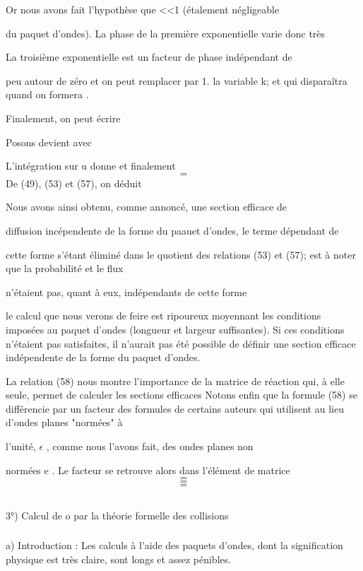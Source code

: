 Or nous avons fait l'hypothèse que <<1 (étalement négligeable

du paquet d'ondes). La phase de la première exponentielle varie donc très

La troisième exponentielle est un facteur de phase indépendant de

peu autour de zéro et on peut remplacer  par 1.
la variable k; et qui disparaîtra quand on formera .

Finalement, on peut écrire

Posons 
 devient  avec


L'intégration sur u donne 
et finalement
\[
\tag{57}=
\]
De (49), (53) et (57), on déduit

Nous avons ainsi obtenu, comme annoncé, une section efficace de

diffusion incépendente de la forme du paauet d'ondes, le terme dépendant de

cette forme  s'étant éliminé dans le quotient des relations
(53) et (57);  est à noter que la probabilité  et le flux

 n'étaient pas, quant à eux, indépendants de cette forme

le calcul que nous verons de feire est ripoureux moyennant les
conditions imposées au paquet d'ondes (longueur et largeur suffisantes).
Si ces conditions n'étaient pas satisfaites, il n'aurait pas été possible de
définir une section efficace indépendente de la forme du paquet d'ondes.

La relation (58) nous montre l'importance de la matrice  de
réaction qui, à elle seule, permet de calculer les sections efficaces
Notons enfin que la formule (58) se différencie par un facteur  des formules de
certains auteurs qui utilisent au lieu d'ondes planes "normées" à

l'unité,  $\epsilon$ , comme nous l'avons fait, des ondes planes non

normées e . Le facteur  se retrouve alors dans l'élément de
matrice
\[
\tag{59}=
\]
\[
\tag{60}=
\]
\[
\tag{61}=
\]

\subsection{}%
3°) Calcul de o par la théorie formelle des collisions

\subsubsection{}%
a) Introduction : Les calculs à l'aide des paquets d'ondes,
dont la signification physique est très claire, sont longs et assez pénibles.

